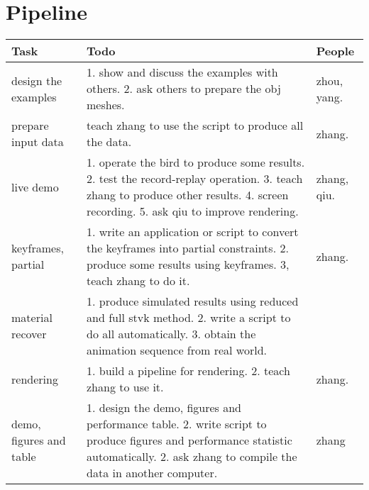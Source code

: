 \documentclass[9pt]{extarticle}
\begin{document}
\section{Pipeline}
\begin{center}
    \begin{longtable}{ | p{3.0cm} | p{12.0cm} | p{2.0cm}|}
    \hline
    Task & Todo & People \\ \hline

    design the examples & 1. show and discuss the examples with others. 2. ask
    others to prepare the obj meshes.& zhou, yang.\\ \hline

    prepare input data& teach zhang to use
    the script to produce all the data.& zhang.\\ \hline
    
    live demo & 1. operate the bird to produce some results. 2. test the
    record-replay operation. 3. teach zhang to produce other results. 4. screen
    recording. 5. ask qiu to improve rendering. & zhang, qiu.\\ \hline

    keyframes, partial & 1. write an application or script to
    convert the keyframes into partial constraints. 2. produce some results
    using keyframes. 3, teach zhang to do it.& zhang.\\ \hline

    material recover &1. produce simulated results using reduced and full stvk
    method. 2. write a script to do all automatically. 3. obtain the animation
    sequence from real world. & \\ \hline

    rendering &1. build a pipeline for rendering. 2. teach zhang to use it. & zhang.\\ \hline

    demo, figures and table & 1. design the demo, figures and performance
    table. 2. write script to produce figures and performance statistic
    automatically. 2. ask zhang to compile the data in another computer.& zhang\\
    \hline

    

    \end{longtable}
\end{center}
\end{document}
